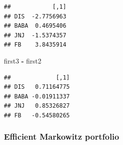 \documentclass[]{article}
\newenvironment{Shaded}{\begin{snugshade}}{\end{snugshade}}
\newcommand{\KeywordTok}[1]{\textcolor[rgb]{0.13,0.29,0.53}{\textbf{#1}}}
\newcommand{\DecValTok}[1]{\textcolor[rgb]{0.00,0.00,0.81}{#1}}
\newcommand{\StringTok}[1]{\textcolor[rgb]{0.31,0.60,0.02}{#1}}
\newcommand{\OperatorTok}[1]{\textcolor[rgb]{0.81,0.36,0.00}{\textbf{#1}}}
\newcommand{\NormalTok}[1]{#1}
\begin{document}
\begin{Shaded}
\end{Shaded}

\begin{verbatim}
##            [,1]
## DIS  -2.7756963
## BABA  0.4695406
## JNJ  -1.5374357
## FB    3.8435914
\end{verbatim}

\begin{Shaded}
\begin{Highlighting}[]
\NormalTok{first3 }\OperatorTok{-}\StringTok{ }\NormalTok{first2}
\end{Highlighting}
\end{Shaded}

\begin{verbatim}
##             [,1]
## DIS   0.71164775
## BABA -0.01911337
## JNJ   0.85326827
## FB   -0.54580265
\end{verbatim}

\subsubsection{Efficient Markowitz
portfolio}\label{efficient-markowitz-portfolio}
\end{document}
